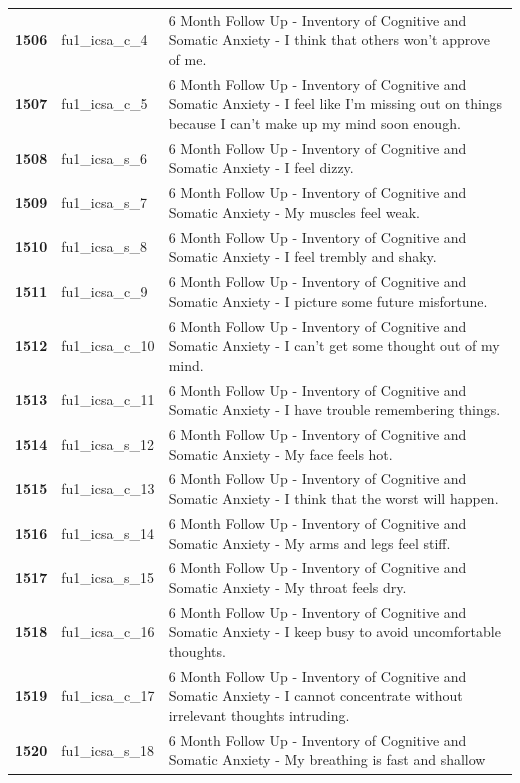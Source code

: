 \documentclass[
  letterpaper,
  DIV=11,
  numbers=noendperiod]{scrartcl}
\begin{document}
\begin{longtable}[t]{>{}cll}
\addlinespace
\textbf{1506} & fu1\_icsa\_c\_4 & 6 Month Follow Up - Inventory of Cognitive and Somatic Anxiety - I think that others won’t approve of me.\\
\textbf{1507} & fu1\_icsa\_c\_5 & 6 Month Follow Up - Inventory of Cognitive and Somatic Anxiety - I feel like I’m missing out on things because I can’t make up my mind soon enough.\\
\textbf{1508} & fu1\_icsa\_s\_6 & 6 Month Follow Up - Inventory of Cognitive and Somatic Anxiety - I feel dizzy.\\
\textbf{1509} & fu1\_icsa\_s\_7 & 6 Month Follow Up - Inventory of Cognitive and Somatic Anxiety - My muscles feel weak.\\
\textbf{1510} & fu1\_icsa\_s\_8 & 6 Month Follow Up - Inventory of Cognitive and Somatic Anxiety - I feel trembly and shaky.\\
\addlinespace
\textbf{1511} & fu1\_icsa\_c\_9 & 6 Month Follow Up - Inventory of Cognitive and Somatic Anxiety - I picture some future misfortune.\\
\textbf{1512} & fu1\_icsa\_c\_10 & 6 Month Follow Up - Inventory of Cognitive and Somatic Anxiety - I can’t get some thought out of my mind.\\
\textbf{1513} & fu1\_icsa\_c\_11 & 6 Month Follow Up - Inventory of Cognitive and Somatic Anxiety - I have trouble remembering things.\\
\textbf{1514} & fu1\_icsa\_s\_12 & 6 Month Follow Up - Inventory of Cognitive and Somatic Anxiety - My face feels hot.\\
\textbf{1515} & fu1\_icsa\_c\_13 & 6 Month Follow Up - Inventory of Cognitive and Somatic Anxiety - I think that the worst will happen.\\
\addlinespace
\textbf{1516} & fu1\_icsa\_s\_14 & 6 Month Follow Up - Inventory of Cognitive and Somatic Anxiety - My arms and legs feel stiff.\\
\textbf{1517} & fu1\_icsa\_s\_15 & 6 Month Follow Up - Inventory of Cognitive and Somatic Anxiety - My throat feels dry.\\
\textbf{1518} & fu1\_icsa\_c\_16 & 6 Month Follow Up - Inventory of Cognitive and Somatic Anxiety - I keep busy to avoid uncomfortable thoughts.\\
\textbf{1519} & fu1\_icsa\_c\_17 & 6 Month Follow Up - Inventory of Cognitive and Somatic Anxiety - I cannot concentrate without irrelevant thoughts intruding.\\
\textbf{1520} & fu1\_icsa\_s\_18 & 6 Month Follow Up - Inventory of Cognitive and Somatic Anxiety - My breathing is fast and shallow\\

\end{longtable}
\end{document}

